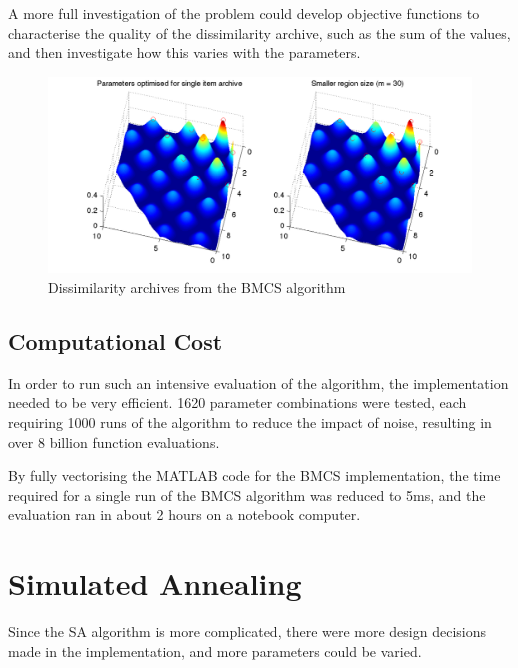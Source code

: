 \documentclass[10pt]{article}
\begin{document}
A more full investigation of the problem could develop objective
functions to characterise the quality of the dissimilarity archive, such as
the sum of the values, and then investigate how this varies with the
parameters.

\begin{figure}[tbp]
  \begin{center}
    \includegraphics[width=16cm]{bmcs_dissim.pdf}
    \end{center}
    \caption{Dissimilarity archives from the BMCS algorithm}
    \label{fig:bmcs_dissim}
    \end{figure}

\subsection{Computational Cost}

In order to run such an intensive evaluation of the algorithm, the
implementation needed to be very efficient. 1620 parameter combinations were
tested, each requiring 1000 runs of the algorithm to reduce the impact of
noise, resulting in over 8 billion function evaluations.

By fully vectorising the MATLAB code for the BMCS implementation, the time
required for a single run of the BMCS algorithm was reduced to 5ms, and the
evaluation ran in about 2 hours on a notebook computer.

\section{Simulated Annealing}

Since the SA algorithm is more complicated, there were more design decisions
made in the implementation, and more parameters could be varied.
\end{document}
